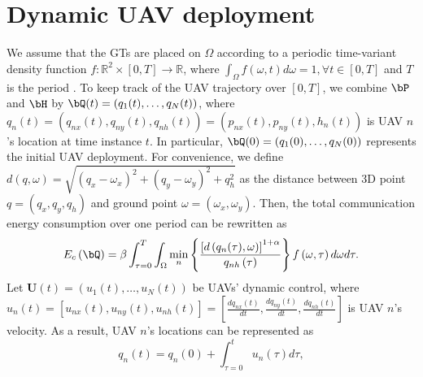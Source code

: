 \section{Dynamic UAV deployment}
%
%
We assume that the GTs are placed on $\Omega$ according to a periodic time-variant density function
$f:\mathbb{R}^2\times[0,T]\to\mathbb{R}$, where $\int_{\Omega}f(\omega,t)d\omega=1, \forall t\in[0,T]$ and $T$ is the
period \cite{Erdem}.  To keep track of the UAV trajectory over $[0,T]$, we combine $\bP$ and $\bH$ by
$\bQ(t)=\left(q_1(t),\dots,q_N(t)\right)$, where
$q_n(t)=\left(q_{nx}(t),q_{ny}(t),q_{nh}(t)\right)=\left(p_{nx}(t),p_{ny}(t),h_n(t)\right)$ is UAV $n$'s location at
time instance $t$.
%
%
In particular, $\bQ(0)=\left(q_1(0),\dots,q_N(0)\right)$ represents the initial UAV deployment.  For convenience, we
define $d\left(q,\omega\right)=\sqrt{\left(q_{x}-\omega_x\right)^2+\left(q_{y}-\omega_y\right)^2+q^2_{h}}$ as the
distance between 3D point $q=\left(q_x,q_y,q_h\right)$ and ground point $\omega=\left(\omega_x,\omega_y\right)$.
%
%
Then, the total communication energy consumption over one period can be rewritten as
%
\begin{equation}
E_c\left(\bQ\right)=\beta\int_{\tau=0}^{T}\int_{\Omega}\min_{n}\left\{\frac{\left[d\left(q_n(\tau),\omega\right)\right]^{1+\alpha}}{q_{nh}\left(\tau\right)}\right\}f\left(\omega,\tau\right)d\omega d\tau.
\end{equation}
%
Let $\mathbf{U}(t)=\left(u_1(t),\dots,u_N(t)\right)$ be UAVs' dynamic control, where $u_n(t)=\left[u_{nx}(t),u_{ny}(t),u_{nh}(t)\right]=\left[\frac{dq_{nx}(t)}{dt},\frac{dq_{ny}(t)}{dt},\frac{dq_{nh}(t)}{dt}\right]$ is UAV $n$'s velocity.
As a result, UAV $n$'s locations can be represented as
\begin{equation}
q_n(t) = q_n(0) + \int_{\tau=0}^{t}u_n(\tau)d\tau,
\end{equation}
